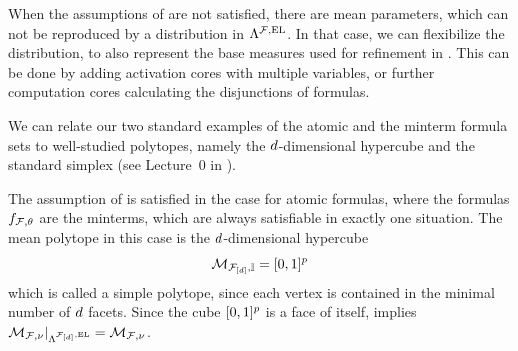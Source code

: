 When the assumptions of  are not satisfied, there are mean parameters, which can not be reproduced by a distribution in $\Lambda^{\mathcal{F},\mathrm{EL}}$.
In that case, we can flexibilize the distribution, to also represent the base measures used for refinement in .
This can be done by adding activation cores with multiple variables, or further computation cores calculating the disjunctions of formulas.







We can relate our two standard examples of the atomic and the minterm formula sets to well-studied polytopes, namely the $d$-dimensional hypercube and the standard simplex (see Lecture~0 in \cite{ziegler_lectures_2013}).

\begin{example}
    The assumption of  is satisfied in the case for atomic formulas, where the formulas  $f_{\mathcal{F},\theta}$ are the minterms, which are always satisfiable in exactly one situation.
    The mean polytope in this case is the $d$-dimensional hypercube
    \begin{align*}
        \mathcal{M}_{\mathcal{F}_{[d]},\mathbb{I}} = [0,1]^{p}
    \end{align*}
    which is called a simple polytope, since each vertex is contained in the minimal number of $d$ facets.
    Since the cube $[0,1]^{p}$ is a face of itself,  implies $\mathcal{M}_{\mathcal{F},\nu}|_{\Lambda^{\mathcal{F}_{[d]},\mathrm{EL}}}=\mathcal{M}_{\mathcal{F},\nu}$.
\end{example}


